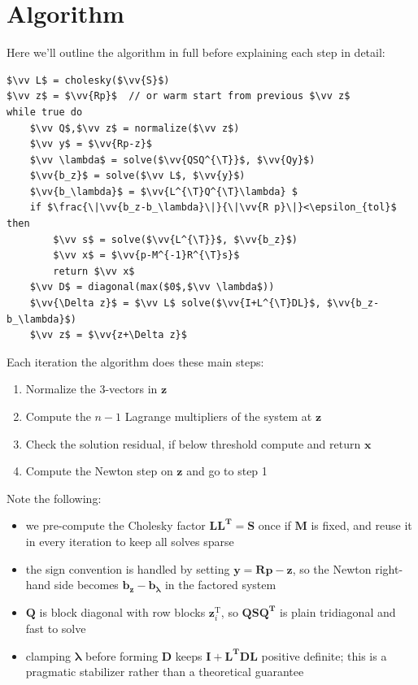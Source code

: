 \documentclass[14pt]{extarticle}
\newcommand*{\vv}[1]{\mathbf{#1}}
\newcommand{\T}{\text{T}}
\begin{document}
\section{Algorithm}
Here we'll outline the algorithm in full before explaining each step in detail:
\begin{center}
\begin{lstlisting}[]
$\vv L$ = cholesky($\vv{S}$)
$\vv z$ = $\vv{Rp}$  // or warm start from previous $\vv z$
while true do
    $\vv Q$,$\vv z$ = normalize($\vv z$)
    $\vv y$ = $\vv{Rp-z}$
    $\vv \lambda$ = solve($\vv{QSQ^{\T}}$, $\vv{Qy}$)
    $\vv{b_z}$ = solve($\vv L$, $\vv{y}$)
    $\vv{b_\lambda}$ = $\vv{L^{\T}Q^{\T}\lambda} $
    if $\frac{\|\vv{b_z-b_\lambda}\|}{\|\vv{R p}\|}<\epsilon_{tol}$ then
        $\vv s$ = solve($\vv{L^{\T}}$, $\vv{b_z}$)
        $\vv x$ = $\vv{p-M^{-1}R^{\T}s}$
        return $\vv x$
    $\vv D$ = diagonal(max($0$,$\vv \lambda$))
    $\vv{\Delta z}$ = $\vv L$ solve($\vv{I+L^{\T}DL}$, $\vv{b_z-b_\lambda}$)
    $\vv z$ = $\vv{z+\Delta z}$
\end{lstlisting}
\end{center}
Each iteration the algorithm does these main steps:
\begin{enumerate}
    \item Normalize the 3-vectors in $\vv z$
    \item Compute the $n-1$ Lagrange multipliers of the system at $\vv z$
    \item Check the solution residual, if below threshold compute and return $\vv x$
    \item Compute the Newton step on $\vv z$ and go to step 1
\end{enumerate}
Note the following:
\begin{itemize}
    \item we pre-compute the Cholesky factor $\vv{LL^{\T}=S}$ once if $\vv M$ is
    fixed, and reuse it in every iteration to keep all solves sparse
    \item the sign convention is handled by setting $\vv y = \vv{Rp-z}$, so the
    Newton right-hand side becomes $\vv{b_z-b_\lambda}$ in the factored system
    \item $\vv Q$ is block diagonal with row blocks $\vv z_i^{\T}$, so
    $\vv{QSQ^{\T}}$ is plain tridiagonal and fast to solve
    \item clamping $\vv \lambda$ before forming $\vv D$ keeps
    $\vv{I+L^{\T}DL}$ positive definite; this is a pragmatic stabilizer rather
    than a theoretical guarantee
\end{itemize}
\end{document}

